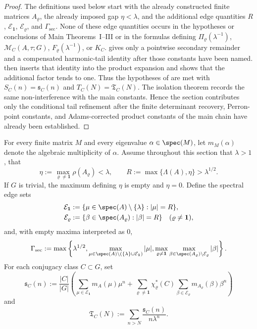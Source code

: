 \begin{proof}
  The definitions used below start with the already constructed finite
  matrices \(A_\varrho\), the already imposed gap \(\eta<\lambda\), and the
  additional edge quantities \(R\), \(\mathcal E_{\mathbf1}\),
  \(\mathcal E_\varrho\), and \(\Gamma_{\mathrm{sec}}\).  None of these edge
  quantities occurs in the hypotheses or conclusions of Main Theorems~I--III
  or in the formulas defining \(\Pi_\varrho(\lambda^{-1})\),
  \(\mathcal M_C(A,\tau;G)\), \(F_\varrho(\lambda^{-1})\), or \(K_C\).
   gives only a pointwise secondary
  remainder and a compensated harmonic-tail identity after those constants
  have been named.   then inserts
  that identity into the product expansion and shows that the additional
  factor tends to one.  Thus the hypotheses of
   are met with
  \(S_C(n)=\mathfrak s_C(n)\) and \(T_C(N)=\mathfrak T_C(N)\).  The isolation
  theorem  records the same
  non-interference with the main constants.  Hence the section contributes
  only the conditional tail refinement after the finite determinant recovery,
  Perron-point constants, and Adams-corrected product constants of the main
  chain have already been established.
\end{proof}

For every finite matrix \(M\) and every eigenvalue
\(\alpha\in\spec(M)\), let \(m_M(\alpha)\) denote the algebraic
multiplicity of \(\alpha\). Assume throughout this section that
\(\lambda>1\), that
\[
  \eta:=\max_{\varrho\neq\mathbf 1}\rho(A_\varrho)<\lambda,
  \qquad
  R:=\max\{\Lambda(A),\eta\}>\lambda^{1/2}.
\]
If \(G\) is trivial, the maximum defining \(\eta\) is empty and
\(\eta=0\).
Define the spectral edge sets
\[
  \begin{aligned}
    \mathcal E_{\mathbf 1}
    &:=\{\mu\in\spec(A)\setminus\{\lambda\}:|\mu|=R\}, \\
    \mathcal E_\varrho
    &:=\{\beta\in\spec(A_\varrho):|\beta|=R\}
    \quad (\varrho\neq\mathbf 1),
  \end{aligned}
\]
and, with empty maxima interpreted as \(0\),
\[
  \Gamma_{\mathrm{sec}}
  :=
  \max\left\{
    \lambda^{1/2},
    \max_{\mu\in\spec(A)\setminus(\{\lambda\}\cup\mathcal E_{\mathbf 1})}
      |\mu|,
    \max_{\varrho\neq\mathbf 1}
      \max_{\beta\in\spec(A_\varrho)\setminus\mathcal E_\varrho}
        |\beta|
  \right\}.
\]
For each conjugacy class \(C\subset G\), set
\begin{equation}\label{eq:class-secondary-profile}
  \mathfrak s_C(n)
  :=
  \frac{|C|}{|G|}
  \left(
    \sum_{\mu\in\mathcal E_{\mathbf 1}}m_A(\mu)\mu^n
    +
    \sum_{\varrho\neq\mathbf 1}\chi_\varrho^\ast(C)
      \sum_{\beta\in\mathcal E_\varrho}m_{A_\varrho}(\beta)\beta^n
  \right)
\end{equation}
and
\begin{equation}\label{eq:class-secondary-tail}
  \mathfrak T_C(N)
  :=
  \sum_{n>N}\frac{\mathfrak s_C(n)}{n\lambda^n}.
\end{equation}

